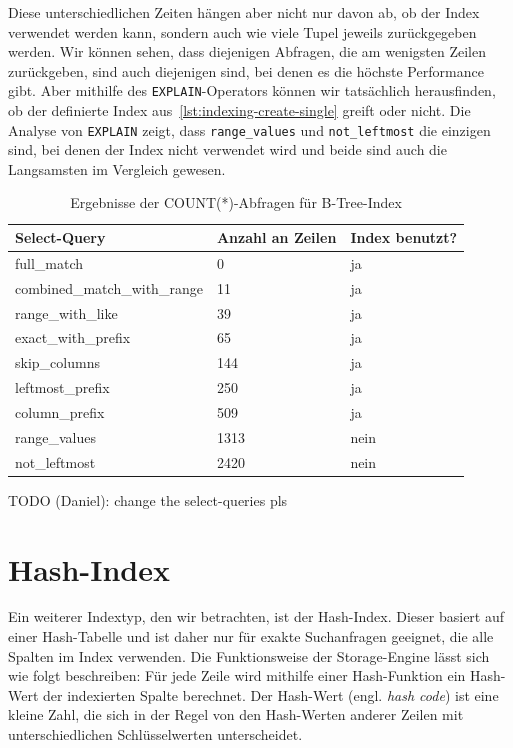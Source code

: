 Diese unterschiedlichen Zeiten hängen aber nicht nur davon ab, ob der Index verwendet werden kann, sondern auch wie viele Tupel jeweils zurückgegeben werden.
Wir können sehen, dass diejenigen Abfragen, die am wenigsten Zeilen zurückgeben, sind auch diejenigen sind, bei denen es die höchste Performance gibt.
Aber mithilfe des \texttt{EXPLAIN}-Operators können wir tatsächlich herausfinden, ob der definierte Index aus~\ref{lst:indexing-create-single} greift oder nicht.
Die Analyse von \texttt{EXPLAIN} zeigt, dass \texttt{range\_values} und \texttt{not\_leftmost} die einzigen sind, bei denen der Index nicht verwendet wird und beide sind auch die Langsamsten im Vergleich gewesen.

\begin{table}[H]
    \centering
    \begin{tabular}{|l|l|l|}
        \hline
        \textbf{Select-Query} & \textbf{Anzahl an Zeilen} & \textbf{Index benutzt?} \\
        \hline
        full\_match & 0 & ja \\
        combined\_match\_with\_range & 11 & ja \\
        range\_with\_like & 39 & ja \\
        exact\_with\_prefix & 65 & ja \\
        skip\_columns & 144 & ja \\
        leftmost\_prefix & 250 & ja \\
        column\_prefix & 509 & ja \\
        range\_values & 1313 & nein \\
        not\_leftmost & 2420 & nein \\
        \hline
    \end{tabular}
    \caption{Ergebnisse der COUNT(*)-Abfragen für B-Tree-Index}
    \label{tab:indexing_b_tree_count_results}
\end{table}
\vspace{-15pt}
TODO (Daniel): change the select-queries pls

\section{Hash-Index}\label{sec:indexing-hash-index}
Ein weiterer Indextyp, den wir betrachten, ist der Hash-Index.
Dieser basiert auf einer Hash-Tabelle und ist daher nur für exakte Suchanfragen geeignet, die alle Spalten im Index verwenden.
Die Funktionsweise der Storage-Engine lässt sich wie folgt beschreiben: Für jede Zeile wird mithilfe einer Hash-Funktion ein Hash-Wert der indexierten Spalte berechnet.
Der Hash-Wert (engl. \textit{hash code}) ist eine kleine Zahl, die sich in der Regel von den Hash-Werten anderer Zeilen mit unterschiedlichen Schlüsselwerten unterscheidet.


